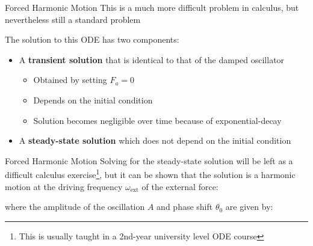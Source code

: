 \documentclass[12pt,compress,aspectratio=169]{beamer}
\begin{document}
\begin{frame}{Forced Harmonic Motion}
  This is a much more difficult problem in calculus, but nevertheless still a
  standard problem
  
  
  The solution to this ODE has two components:
  \begin{itemize}
  \item A \textbf{transient solution} that is identical to that of the damped
    oscillator
    \begin{itemize}
    \item Obtained by setting $F_a=0$
    \item Depends on the initial condition
    \item Solution becomes negligible over time because of exponential-decay
    \end{itemize}
  \item A \textbf{steady-state solution} which does not depend on the initial
    condition
  \end{itemize}
\end{frame}



\begin{frame}{Forced Harmonic Motion}
  Solving for the steady-state solution will be left as a difficult calculus
  exercise\footnote{This is usually taught in a 2nd-year university level ODE
  course}, but it can be shown that the solution is a harmonic motion at the
  driving frequency $\omega_\text{ext}$ of the external force:

  
  where the amplitude of the oscillation $A$ and phase shift $\theta_0$ are
  given by:

  \vspace{.5in}
\end{frame}
\end{document}
